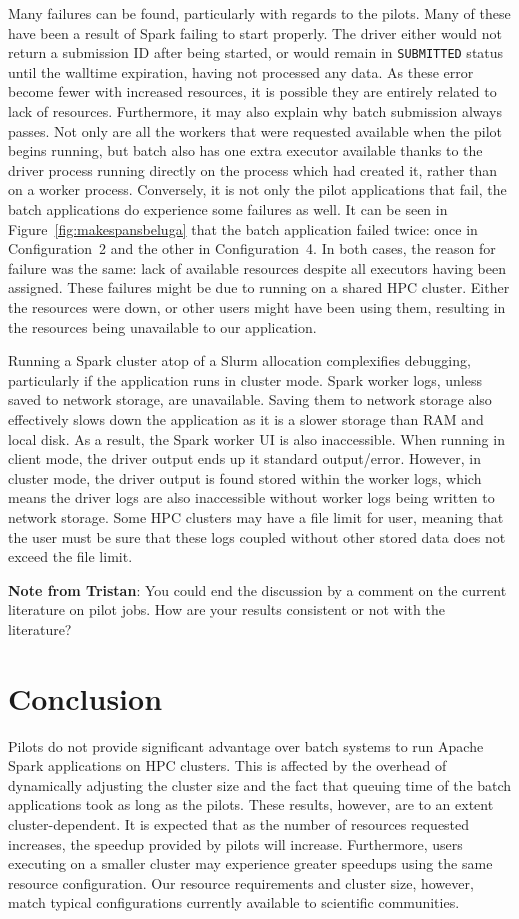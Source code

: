 \documentclass{IEEEtran}
\newcommand{\tristan}[1]{\color{red}\textbf{Note from Tristan}:
      #1 \color{black}}
\newcommand{\TG}[1]{\tristan{#1}}
\begin{document}
Many failures can be found, particularly with regards to the pilots. Many
of these have been a result of Spark failing to start properly. The driver
either would not return a submission ID after being started, or would
remain in \texttt{SUBMITTED} status until the walltime expiration, having
not processed any data. As these error become fewer with increased
resources, it is possible they are entirely related to lack of resources.
Furthermore, it may also explain why batch submission always passes. Not
only are all the workers that were requested available when the pilot
begins running, but batch also has one extra executor available thanks to the driver
process running directly on the process which had created it, rather than on a
worker process. Conversely, it is not only the pilot applications that
fail, the batch applications do experience some failures as well. It can be
seen in Figure~\ref{fig:makespansbeluga} that the batch application failed
twice: once in Configuration~2 and the other in Configuration~4. In both
cases, the reason for failure was the same: lack of available resources
despite all executors having been assigned. These failures might be due to
running on a shared HPC cluster. Either the resources were down, or other users might
have been using them, resulting in the resources being unavailable to our
application.

Running a Spark cluster atop of a Slurm allocation complexifies debugging, particularly if the application runs in cluster mode.
Spark worker logs, unless saved to network storage, are unavailable. Saving them to network storage also effectively slows down
the application as it is a slower storage than RAM and local disk. As a result, the Spark worker UI is also inaccessible. When running
in client mode, the driver output ends up it standard output/error. However, in cluster mode, the driver output is found stored within
the worker logs, which means the driver logs are also inaccessible without worker logs being written to network storage. Some HPC clusters
may have a file limit for user, meaning that the user must be sure that these logs coupled without other stored data does not exceed the file
limit.  

\TG{You could end the discussion by a comment on the current literature on pilot jobs. How are your results
consistent or not with the literature?}

\section{Conclusion}\label{sec:conclusion}
Pilots do not provide significant advantage over batch systems to run
Apache Spark applications on HPC clusters. This is affected by the overhead of dynamically
adjusting the cluster size and the fact that queuing time of the batch
applications took as long as the pilots. These results, however, are to an
extent cluster-dependent. It is expected that as the number of resources
requested increases, the speedup provided by pilots will increase.
Furthermore, users executing on a smaller cluster may experience greater
speedups using the same resource configuration. Our resource requirements
and cluster size, however, match typical configurations currently available
to scientific communities.
\end{document}
